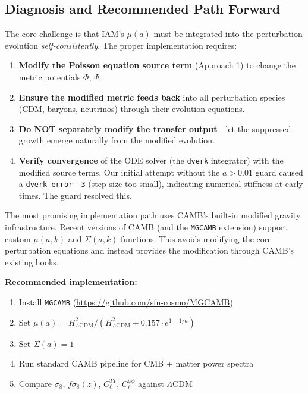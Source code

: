 \documentclass[11pt,letterpaper]{article}
\begin{document}
\subsection{Diagnosis and Recommended Path Forward}

The core challenge is that IAM's $\mu(a)$ must be integrated into the perturbation evolution \textit{self-consistently}. The proper implementation requires:

\begin{enumerate}
\item \textbf{Modify the Poisson equation source term} (Approach 1) to change the metric potentials $\Phi$, $\Psi$.

\item \textbf{Ensure the modified metric feeds back} into all perturbation species (CDM, baryons, neutrinos) through their evolution equations.

\item \textbf{Do NOT separately modify the transfer output}---let the suppressed growth emerge naturally from the modified evolution.

\item \textbf{Verify convergence} of the ODE solver (the \texttt{dverk} integrator) with the modified source terms. Our initial attempt without the $a > 0.01$ guard caused a \texttt{dverk error -3} (step size too small), indicating numerical stiffness at early times. The guard resolved this.
\end{enumerate}

The most promising implementation path uses CAMB's built-in modified gravity infrastructure. Recent versions of CAMB (and the \texttt{MGCAMB} extension) support custom $\mu(a,k)$ and $\Sigma(a,k)$ functions. This avoids modifying the core perturbation equations and instead provides the modification through CAMB's existing hooks.

\textbf{Recommended implementation:}

\begin{enumerate}
\item Install \texttt{MGCAMB} (\url{https://github.com/sfu-cosmo/MGCAMB})
\item Set $\mu(a) = H^2_{\Lambda\text{CDM}}/(H^2_{\Lambda\text{CDM}} + 0.157 \cdot e^{1-1/a})$
\item Set $\Sigma(a) = 1$
\item Run standard CAMB pipeline for CMB + matter power spectra
\item Compare $\sigma_8$, $f\sigma_8(z)$, $C_\ell^{TT}$, $C_\ell^{\phi\phi}$ against $\Lambda$CDM
\end{enumerate}
\end{document}
